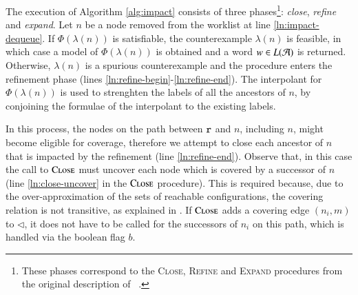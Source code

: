 \documentclass[10pt,conference,letterpaper,twocolumn]{IEEEtran}
\begin{document}
The execution of Algorithm \ref{alg:impact} consists of three
phases\footnote{These phases correspond to the \textsc{Close},
  \textsc{Refine} and \textsc{Expand} procedures from the original
  description of \impact~\cite{mcmillan06}.}: \emph{close},
\emph{refine} and \emph{expand}. Let $n$ be a node removed from the
worklist at line \ref{ln:impact-dequeue}. If $\Phi(\lambda(n))$ is
satisfiable, the counterexample $\lambda(n)$ is feasible, in which
case a model of $\Phi(\lambda(n))$ is obtained and a word $w \in
L(\mathcal{A})$ is returned. 
%
%
%
Otherwise, $\lambda(n)$ is a spurious counterexample and the procedure
enters the refinement phase (lines
\ref{ln:refine-begin}-\ref{ln:refine-end}). The interpolant for
$\Phi(\lambda(n))$ is used to strenghten the labels of all the
ancestors of $n$, by conjoining the formulae of the interpolant to the
existing labels. 

In this process, the nodes on the path between $\mathtt{r}$ and $n$,
including $n$, might become eligible for coverage, therefore we
attempt to close each ancestor of $n$ that is impacted by the
refinement (line \ref{ln:refine-end}). Observe that, in this case the
call to $\Call{Close}{}$ must uncover each node which is covered by a
successor of $n$ (line \ref{ln:close-uncover} in the $\Call{Close}{}$
procedure). This is required because, due to the over-approximation of
the sets of reachable configurations, the covering relation is not
transitive, as explained in \cite{mcmillan06}. If $\Call{Close}{}$
adds a covering edge $(n_i,m)$ to $\lhd$, it does not have to be
called for the successors of $n_i$ on this path, which is handled via
the boolean flag $b$.
\end{document}
